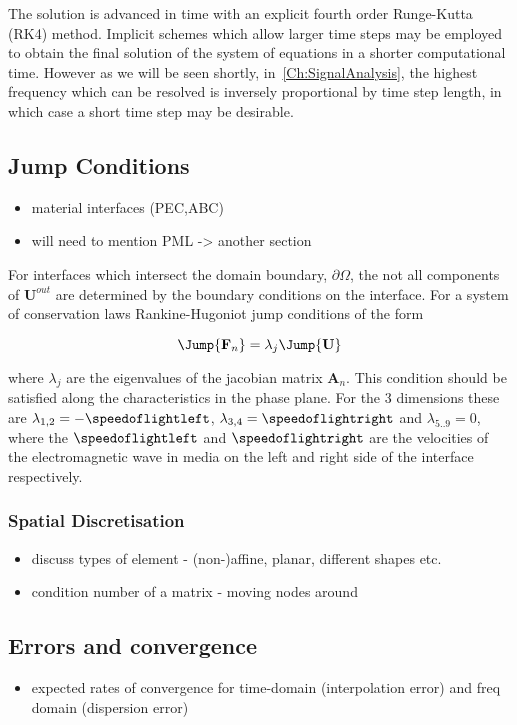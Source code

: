 The solution is advanced in time with an explicit fourth order Runge-Kutta (RK4) method. Implicit schemes which allow larger time steps may be employed to obtain the final solution of the system of equations in a shorter computational time. However as we will be seen shortly, in~\autoref{Ch:SignalAnalysis}, the highest frequency which can be resolved is inversely proportional by time step length, in which case a short time step may be desirable.
\subsection{Jump Conditions}
\begin{itemize}
	\item material interfaces (PEC,ABC)
  \item will need to mention PML -> another section
\end{itemize}

For interfaces which intersect the domain boundary, $\partial \Omega$, the not all components of $\mathbf{U}^{out}$ are determined by the boundary conditions on the interface. For a system of conservation laws Rankine-Hugoniot jump conditions of the form

$$
\Jump{ \mathbf{F}_n } = \lambda_j \Jump{ \mathbf{U} }
$$

where $\lambda_j$ are the eigenvalues of the jacobian matrix $\mathbf{A}_n$. This condition should be satisfied along the characteristics in the phase plane. For the 3 dimensions these are $ \lambda_{ 1,2 } = - \speedoflightleft $, $ \lambda_{ 3,4 } = \speedoflightright $ and $\lambda_{5..9} = 0 $, where the $\speedoflightleft$ and $\speedoflightright$ are the velocities of the electromagnetic wave in media on the left and right side of the interface respectively.

\subsubsection{Spatial Discretisation}
\begin{itemize}
	\item discuss types of element - (non-)affine, planar, different shapes etc.
	\item condition number of a matrix - moving nodes around %
\end{itemize}

\subsection{Errors and convergence}
\begin{itemize}
  \item expected rates of convergence for time-domain (interpolation error) and freq domain (dispersion error)
\end{itemize}

